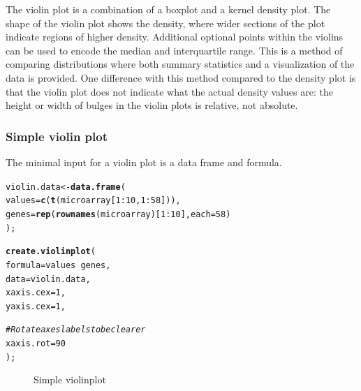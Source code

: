 \documentclass[letterpaper]{article}\usepackage[]{graphicx}\usepackage[]{color}
\makeatletter
\newcommand{\hlnum}[1]{\textcolor[rgb]{0.686,0.059,0.569}{#1}}%
\newcommand{\hlcom}[1]{\textcolor[rgb]{0.678,0.584,0.686}{\textit{#1}}}%
\newcommand{\hlopt}[1]{\textcolor[rgb]{0,0,0}{#1}}%
\newcommand{\hlstd}[1]{\textcolor[rgb]{0.345,0.345,0.345}{#1}}%
\newcommand{\hlkwb}[1]{\textcolor[rgb]{0.69,0.353,0.396}{#1}}%
\newcommand{\hlkwc}[1]{\textcolor[rgb]{0.333,0.667,0.333}{#1}}%
\newcommand{\hlkwd}[1]{\textcolor[rgb]{0.737,0.353,0.396}{\textbf{#1}}}%
\newenvironment{kframe}{%
 \def\at@end@of@kframe{}%
 \ifinner\ifhmode%
  \def\at@end@of@kframe{\end{minipage}}%
  \begin{minipage}{\columnwidth}%
 \fi\fi%
 \def\FrameCommand##1{\hskip\@totalleftmargin \hskip-\fboxsep
 \colorbox{shadecolor}{##1}\hskip-\fboxsep
     \hskip-\linewidth \hskip-\@totalleftmargin \hskip\columnwidth}%
 \MakeFramed {\advance\hsize-\width
   \@totalleftmargin\z@ \linewidth\hsize
   \@setminipage}}%
 {\par\unskip\endMakeFramed%
 \at@end@of@kframe}
\newenvironment{knitrout}{}{} %
\makeatother
\begin{document}
The violin plot is a combination of a boxplot and a kernel density plot. The shape of the violin plot shows the density, where wider sections of the plot indicate regions of higher density. Additional optional points within the violins can be used to encode the median and interquartile range. This is a method of comparing distributions where both summary statistics and a visualization of the data is provided. One difference with this method compared to the density plot is that the violin plot does not indicate what the actual density values are: the height or width of bulges in the violin plots is relative, not absolute.

\subsubsection{Simple violin plot}
The minimal input for a violin plot is a data frame and formula.
\begin{knitrout}
\color{fgcolor}\begin{kframe}
\begin{alltt}
\hlstd{violin.data} \hlkwb{<-} \hlkwd{data.frame}\hlstd{(}
    \hlkwc{values} \hlstd{=} \hlkwd{c}\hlstd{(}\hlkwd{t}\hlstd{(microarray[}\hlnum{1}\hlopt{:}\hlnum{10}\hlstd{,} \hlnum{1}\hlopt{:}\hlnum{58}\hlstd{])),}
    \hlkwc{genes} \hlstd{=} \hlkwd{rep}\hlstd{(}\hlkwd{rownames}\hlstd{(microarray)[}\hlnum{1}\hlopt{:}\hlnum{10}\hlstd{],} \hlkwc{each} \hlstd{=} \hlnum{58}\hlstd{)}
    \hlstd{);}

\hlkwd{create.violinplot}\hlstd{(}
    \hlkwc{formula} \hlstd{= values} \hlopt{~} \hlstd{genes,}
    \hlkwc{data} \hlstd{= violin.data,}
        \hlkwc{xaxis.cex} \hlstd{=} \hlnum{1}\hlstd{,}
        \hlkwc{yaxis.cex} \hlstd{=} \hlnum{1}\hlstd{,}

    \hlcom{# Rotate axes labels to be clearer}
    \hlkwc{xaxis.rot} \hlstd{=} \hlnum{90}
    \hlstd{);}
\end{alltt}
\end{kframe}\begin{figure}

{\centering {} 

}

\caption[Simple violinplot]{Simple violinplot\label{fig:violinplot}}
\end{figure}


\end{knitrout}
\end{document}
